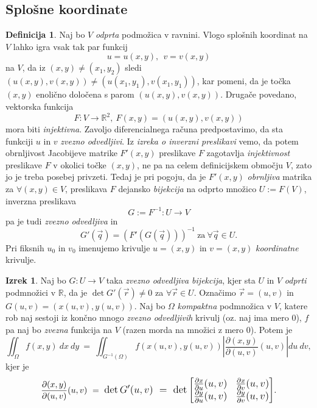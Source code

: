\documentclass[11pt]{article}
\theoremstyle{definition}
\newtheorem{definicija}{Definicija}[section]
\theoremstyle{definition}
\theoremstyle{definition}
\newtheorem{izrek}{Izrek}[section]
\begin{document}

\subsection{Splošne koordinate}
\vspace{0.5cm}

\begin{definicija}

Naj bo $V$ \textit{odprta} podmožica v ravnini. Vlogo splošnih koordinat na $V$ lahko igra vsak tak par funkcij
$$u = u(x, y), ~~v = v(x, y)$$
na $V$, da iz $(x, y) \neq (x_1, y_2)$ sledi  $(u(x, y), v(x, y)) \neq (u(x_1, y_1), v(x_1, y_1))$, kar pomeni, da je točka $(x, y)$ enolično določena s parom $(u(x, y), v(x, y))$. Drugače povedano, vektorska funkcija 
$$F: V \rightarrow \mathbb{R}^2, ~F(x, y) = (u(x, y), v(x, y))$$
mora biti \textit{injektivna}. Zavoljo diferencialnega računa  predpostavimo, da sta funkciji $u$ in $v$ \textit{zvezno odvedljivi}. Iz \textit{izreka o inverzni preslikavi} vemo, da potem obrnljivost Jacobijeve matrike $F'(x, y)$ preslikave $F$ zagotavlja \textit{injektivnost} preslikave $F$ v okolici točke $(x, y)$, ne pa na celem definicijskem območju $V$, zato jo je treba posebej privzeti. Tedaj je pri pogoju, da je $F'(x, y)$ \textit{obrnljiva} matrika za $\forall (x, y) \in V$, preslikava $F$ dejansko \textit{bijekcija} na odprto množico $U := F(V)$, inverzna preslikava
$$G := F^{-1}: U \rightarrow V$$
pa je tudi \textit{zvezno odvedljiva} in 
$$G'(\vec{q}) = (F'(G(\vec{q})))^{-1} ~\text{za}~ \forall \vec{q} \in U.$$
Pri fiksnih $u_0$ in $v_0$ imenujemo krivulje $u = (x, y)$ in $v = (x, y)$ \textit{koordinatne} krivulje.

\end{definicija}
\vspace{0.5cm}

\begin{izrek}

Naj bo $G: U \rightarrow V$ taka \textit{zvezno odvedljiva bijekcija}, kjer sta $U$ in $V$ \textit{odprti} podmnožici v $\mathbb{R}$, da je $\det{G'(\vec{r})} \neq 0$ za $\forall \vec{r} \in U$. Označimo $\vec{r} = (u, v)$ in $G(u, v) = (x(u, v), y(u, v))$. Naj bo $\Omega$ \textit{kompaktna} podmnožica v $V$, katere rob naj sestoji iz končno mnogo \textit{zvezno odvedljivih} krivulj (oz. naj ima mero $0$), $f$ pa naj bo \textit{zvezna} funkcija na $V$ (razen morda na množici z mero $0$). Potem je
$$\iint_{\Omega} f(x, y) ~dx ~dy ~=~ \iint_{G^{-1}(\Omega)} f(x(u, v), y(u, v)) \left| \frac{\partial (x, y)}{\partial (u, v)}(u, v) \right| du ~dv,$$
kjer je 
$$\frac{\partial(x, y)}{\partial (u, v)}(u, v) ~=~ \mathlarger{\det{G'(u, v)} ~=~ \det{\begin{bmatrix}
\frac{\partial x}{\partial u}(u, v) & \frac{\partial x}{\partial v}(u, v) \\
\frac{\partial y}{\partial u}(u, v) & \frac{\partial y}{\partial v}(u, v)
\end{bmatrix}}}.$$

\end{izrek}
\vspace{0.5cm}
\end{document}
